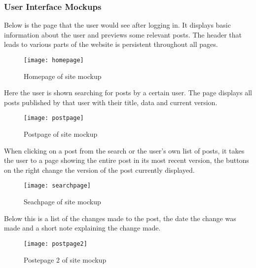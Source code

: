\subsubsection{User Interface Mockups}
Below is the page that the user would see after logging in. 
It displays basic information about the user and previews some relevant posts.
The header that leads to various parts of the website is persistent throughout all pages.

\begin{figure}[h]
\centering %
\texttt{[image: homepage]} %
\caption{Homepage of site mockup}
\label{fig: homepage} %
\end{figure}
\newpage

\noindent	
Here the user is shown searching for posts by a certain user. 
The page displays all posts published by that user with their title, 
data and current version.

\begin{figure}[h]
\centering %
\texttt{[image: postpage]} %
\caption{Postpage of site mockup}
\label{fig: postpage} %
\end{figure}
\newpage

\noindent	
When clicking on a post from the search or the user's own list of posts, 
it takes the user to a page showing the entire post in its most recent version, 
the buttons on the right change the version of the post currently displayed.

\begin{figure}[h]
\centering %
\texttt{[image: searchpage]} %
\caption{Seachpage of site mockup}
\label{fig: searchpage} %
\end{figure}
\newpage

\noindent
Below this is a list of the changes made to the post, 
the date the change was made and a short note explaining the change made.

\begin{figure}[h]
\centering %
\texttt{[image: postpage2]} %
\caption{Postepage 2 of site mockup}
\label{fig: postepage2} %
\end{figure}
\newpage
